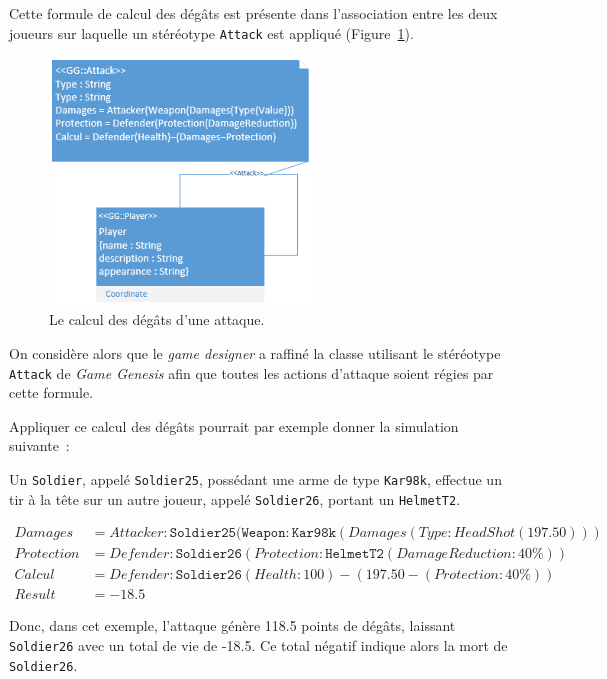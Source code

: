 

Cette formule de calcul des dégâts est présente dans l'association entre les deux joueurs sur laquelle un stéréotype \texttt{Attack} est appliqué (Figure~\ref{fig.PUBG_attack_degats}).

\begin{figure}
    \centering
    \includegraphics[width=7cm]{10_img/chap6/p_attack_p.PNG}
    \caption{Le calcul des dégâts d'une attaque.}
    \label{fig.PUBG_attack_degats}
\end{figure}

On considère alors que le \emph{game designer} a raffin\'e la classe utilisant le stéréotype \texttt{Attack} de \emph{Game Genesis} afin que toutes les actions d'attaque soient régies par cette formule.



Appliquer ce calcul des dégâts pourrait par exemple donner la simulation suivante~: 
{\footnotesize
\begin{framed}
Un \texttt{Soldier}, appelé \texttt{Soldier25}, possédant une arme de type \texttt{Kar98k}, effectue un tir à la tête sur un autre joueur, appelé \texttt{Soldier26}, portant un \texttt{HelmetT2}.


\begin{equation*}
\begin{split}
Damages& = Attacker:\texttt{Soldier25}(\texttt{Weapon}:\texttt{Kar98k}(Damages(Type:HeadShot(197.50)))\\
Protection& = Defender:\texttt{Soldier26}(Protection:\texttt{HelmetT2}(DamageReduction:40\%))\\
Calcul& = Defender:\texttt{Soldier26}(Health:100) - (197.50 - (Protection:40\%))\\
Result& = -18.5
\end{split}
\end{equation*}


Donc, dans cet exemple, l'attaque génère 118.5 points de dégâts, laissant \texttt{Soldier26} avec un total de vie de -18.5. Ce total négatif indique alors la mort de \texttt{Soldier26}.
\end{framed}
}

